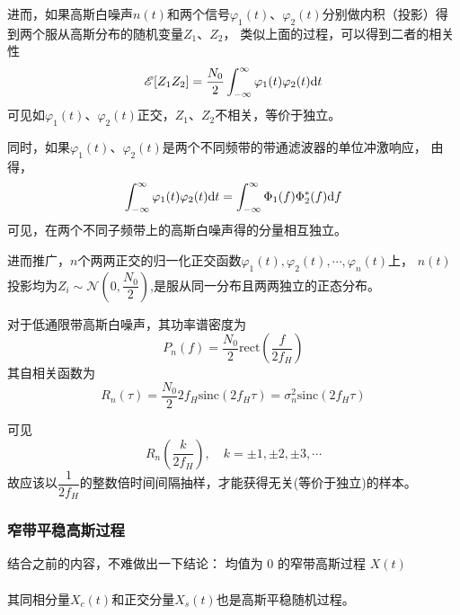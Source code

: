    进而，如果高斯白噪声$n(t)$和两个信号$\varphi_1(t)$、$\varphi_2(t)$分别做内积（投影）得到两个服从高斯分布的随机变量$Z_1$、$Z_2$，
    类似上面的过程，可以得到二者的相关性
    \begin{equation}\label{eq:AWGN-conv}
        \mathscr{E}[Z_1Z_2]=\frac{N_0}{2}\int_{-\infty}^{\infty}\varphi_1(t)\varphi_2(t)\text{\upshape d} t
    \end{equation}
    可见如$\varphi_1(t)$、$\varphi_2(t)$正交，$Z_1$、$Z_2$不相关，等价于独立。

    同时，如果$\varphi_1(t)$、$\varphi_2(t)$是两个不同频带的带通滤波器的单位冲激响应，
    由得，
    \begin{equation}
        \int_{-\infty}^{\infty}\varphi_1(t)\varphi_2(t)\text{\upshape d} t=\int_{-\infty}^{\infty}\Phi_1(f)\Phi_2^*(f)\text{\upshape d} f
    \end{equation}
    可见，在两个不同子频带上的高斯白噪声得的分量相互独立。

    进而推广，$n$个两两正交的归一化正交函数$\varphi_1(t),\varphi_2(t),\cdots,\varphi_n(t)$上，
    $n(t)$投影均为$Z_i\sim\mathscr{N}(0,\dfrac{N_0}{2})$,是服从同一分布且两两独立的正态分布。

    对于低通限带高斯白噪声，其功率谱密度为
    \begin{equation}
        P_n(f)=\frac{N_0}{2}\text{rect}\left(\frac{f}{2f_H}\right)
    \end{equation}
    其自相关函数为
    \begin{equation}
        R_n(\tau)=\frac{N_0}{2}2f_H\text{sinc}(2f_H\tau)=\sigma_n^2\text{sinc}(2f_H\tau)
    \end{equation}

    可见
    \begin{equation}
        R_n\left(\frac{k}{2f_H}\right),\hspace{1em}k=\pm 1,\pm 2,\pm 3,\cdots
    \end{equation}
    故应该以$\dfrac{1}{2f_H}$的整数倍时间间隔抽样，才能获得无关(等价于独立)的样本。

    \subsubsection{窄带平稳高斯过程}\label{subsubsec:BAWGN}
    
    结合之前的内容，不难做出一下\emph{}{结论}：
    均值为 0 的窄带高斯过程 $X(t)$
    \paragraph{}其同相分量$X_c(t)$和正交分量$X_s(t)$也是高斯平稳随机过程。
